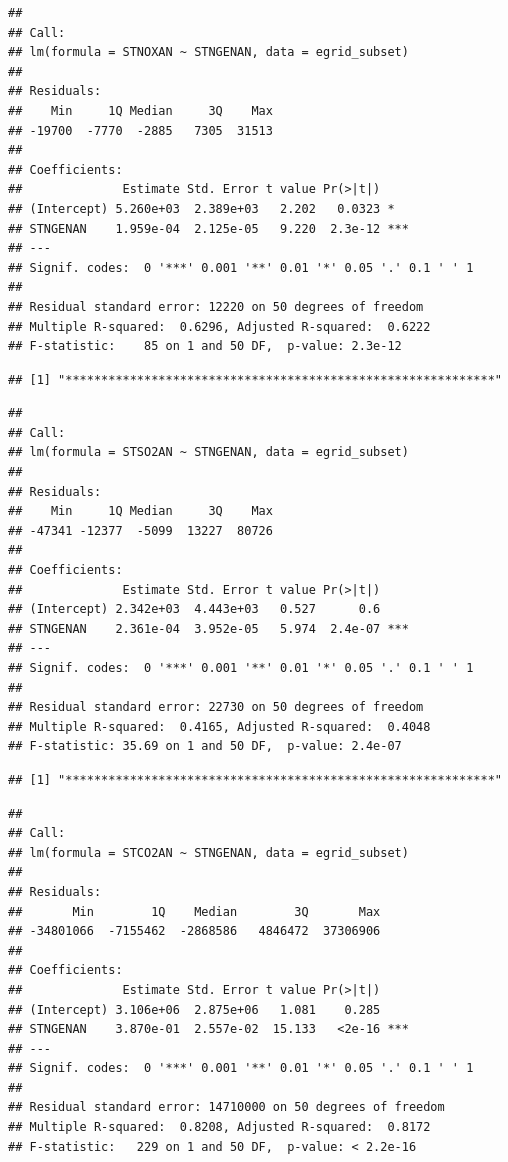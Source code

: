 \documentclass[
]{article}
\begin{document}
\begin{verbatim}
## 
## Call:
## lm(formula = STNOXAN ~ STNGENAN, data = egrid_subset)
## 
## Residuals:
##    Min     1Q Median     3Q    Max 
## -19700  -7770  -2885   7305  31513 
## 
## Coefficients:
##              Estimate Std. Error t value Pr(>|t|)    
## (Intercept) 5.260e+03  2.389e+03   2.202   0.0323 *  
## STNGENAN    1.959e-04  2.125e-05   9.220  2.3e-12 ***
## ---
## Signif. codes:  0 '***' 0.001 '**' 0.01 '*' 0.05 '.' 0.1 ' ' 1
## 
## Residual standard error: 12220 on 50 degrees of freedom
## Multiple R-squared:  0.6296, Adjusted R-squared:  0.6222 
## F-statistic:    85 on 1 and 50 DF,  p-value: 2.3e-12
\end{verbatim}

\begin{verbatim}
## [1] "************************************************************"
\end{verbatim}

\begin{verbatim}
## 
## Call:
## lm(formula = STSO2AN ~ STNGENAN, data = egrid_subset)
## 
## Residuals:
##    Min     1Q Median     3Q    Max 
## -47341 -12377  -5099  13227  80726 
## 
## Coefficients:
##              Estimate Std. Error t value Pr(>|t|)    
## (Intercept) 2.342e+03  4.443e+03   0.527      0.6    
## STNGENAN    2.361e-04  3.952e-05   5.974  2.4e-07 ***
## ---
## Signif. codes:  0 '***' 0.001 '**' 0.01 '*' 0.05 '.' 0.1 ' ' 1
## 
## Residual standard error: 22730 on 50 degrees of freedom
## Multiple R-squared:  0.4165, Adjusted R-squared:  0.4048 
## F-statistic: 35.69 on 1 and 50 DF,  p-value: 2.4e-07
\end{verbatim}

\begin{verbatim}
## [1] "************************************************************"
\end{verbatim}

\begin{verbatim}
## 
## Call:
## lm(formula = STCO2AN ~ STNGENAN, data = egrid_subset)
## 
## Residuals:
##       Min        1Q    Median        3Q       Max 
## -34801066  -7155462  -2868586   4846472  37306906 
## 
## Coefficients:
##              Estimate Std. Error t value Pr(>|t|)    
## (Intercept) 3.106e+06  2.875e+06   1.081    0.285    
## STNGENAN    3.870e-01  2.557e-02  15.133   <2e-16 ***
## ---
## Signif. codes:  0 '***' 0.001 '**' 0.01 '*' 0.05 '.' 0.1 ' ' 1
## 
## Residual standard error: 14710000 on 50 degrees of freedom
## Multiple R-squared:  0.8208, Adjusted R-squared:  0.8172 
## F-statistic:   229 on 1 and 50 DF,  p-value: < 2.2e-16
\end{verbatim}
\end{document}
